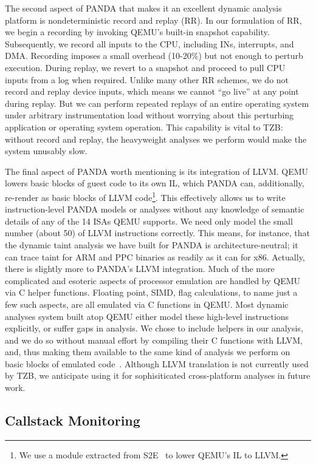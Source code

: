 The second aspect of PANDA that makes it an excellent dynamic analysis
platform is nondeterministic record and replay (RR). In our formulation
of RR, we begin a recording by invoking QEMU's built-in snapshot
capability. Subsequently, we record all inputs to the CPU, including
INs, interrupts, and DMA. Recording imposes a small overhead (10-20\%)
but not enough to perturb execution. During replay, we revert to a
snapshot and proceed to pull CPU inputs from a log when required.
Unlike many other RR schemes, we do not record and replay device inputs,
which means we cannot ``go live'' at any point during replay. But we
can perform repeated replays of an entire operating system under
arbitrary instrumentation load without worrying about this perturbing
application or operating system operation. This capability is vital to
TZB: without record and replay, the heavyweight analyses we perform
would make the system unusably slow.

The final aspect of PANDA worth mentioning is its integration of LLVM.
QEMU lowers basic blocks of guest code to its own IL, which PANDA can,
additionally, re-render as basic blocks of LLVM code\footnote{We use a
module extracted from S2E~\cite{Chipounov:2011s2e} to lower QEMU's IL to
LLVM.}. This effectively allows us to write instruction-level PANDA
models or analyses without any knowledge of semantic details of any of
the 14 ISAs QEMU supports. We need only model the small number (about
50) of LLVM instructions correctly. This means, for instance, that the
dynamic taint analysis we have built for PANDA is architecture-neutral;
it can trace taint for ARM and PPC binaries as readily as it can for
x86. Actually, there is slightly more to PANDA's LLVM integration.
Much of the more complicated and esoteric aspects of processor emulation
are handled by QEMU via C helper functions. Floating point, SIMD, flag
calculations, to name just a few such aspects, are all emulated via C
functions in QEMU. Most dynamic analyses system built atop QEMU either
model these high-level instructions explicitly, or suffer gaps in
analysis. We chose to include helpers in our analysis, and we do so
without manual effort by compiling their C functions with LLVM, and,
thus making them available to the same kind of analysis we perform on
basic blocks of emulated code~\cite{Whelan:2013architecture}. Although
LLVM translation is not currently used by TZB, we anticipate using it
for sophisiticated cross-platform analyses in future work.

\subsection{Callstack Monitoring}
\label{sec:implementation:subsec:callstack}

